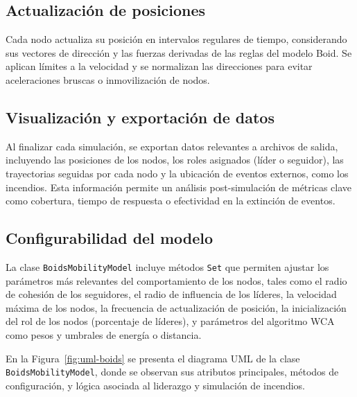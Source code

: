 \documentclass{article}
\begin{document}
\subsection{Actualización de posiciones}

Cada nodo actualiza su posición en intervalos regulares de tiempo, considerando sus vectores de dirección y las fuerzas derivadas de las reglas del modelo Boid. Se aplican límites a la velocidad y se normalizan las direcciones para evitar aceleraciones bruscas o inmovilización de nodos.

\subsection{Visualización y exportación de datos}

Al finalizar cada simulación, se exportan datos relevantes a archivos de salida, incluyendo las posiciones de los nodos, los roles asignados (líder o seguidor), las trayectorias seguidas por cada nodo y la ubicación de eventos externos, como los incendios.
Esta información permite un análisis post-simulación de métricas clave como cobertura, tiempo de respuesta o efectividad en la extinción de eventos.

\subsection{Configurabilidad del modelo}

La clase \texttt{BoidsMobilityModel} incluye métodos \texttt{Set} que permiten ajustar los parámetros más relevantes del comportamiento de los nodos, tales como el radio de cohesión de los seguidores, el radio de influencia de los líderes, la velocidad máxima de los nodos, la frecuencia de actualización de posición, la inicialización del rol de los nodos (porcentaje de líderes), y parámetros del algoritmo WCA como pesos y umbrales de energía o distancia. 

En la Figura~\ref{fig:uml-boids} se presenta el diagrama UML de la clase \texttt{BoidsMobilityModel}, donde se observan sus atributos principales, métodos de configuración, y lógica asociada al liderazgo y simulación de incendios.
\end{document}
